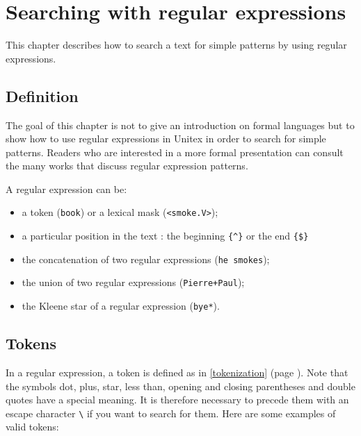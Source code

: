 \chapter{Searching with regular expressions}
\label{chap-regexp}

This chapter describes how to search a text for simple patterns by using regular
expressions.

\section{Definition}

The goal of this chapter is not to give an introduction on formal languages but
to show how to use regular expressions in Unitex in order to search for simple
patterns. Readers who are interested in a more formal presentation can consult
the many works that discuss regular expression patterns.

\bigskip \noindent A regular expression can be:

\begin{itemize}
  \item a token (\verb+book+) or a lexical mask
  (\verb+<smoke.V>+);
  \item a particular position in the text : the beginning \verb+{^}+ or the end \verb+{$}+
  \item the concatenation of two regular
  expressions (\verb+he smokes+);
  \item the union of two regular expressions
  (\verb$Pierre+Paul$); 
  \item the Kleene star of a regular expression
  (\verb+bye*+).
\end{itemize}





\section{Tokens}

In a regular expression, a token is defined as in \ref{tokenization} (page
\pageref{tokenization}). Note that the symbols dot, plus,
star, less than, opening and closing parentheses and double quotes have a
special meaning. It is therefore necessary to precede them with an escape character
\verb+\+ if you want to search for them. Here are some examples of valid
tokens: \index{\verb+\+}

